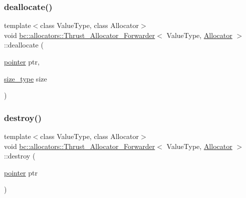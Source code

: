 \mbox{\label{structbc_1_1allocators_1_1Thrust__Allocator__Forwarder_a9102877ab68637a741aaf421b62bb2ef}} 
\subsubsection{\texorpdfstring{deallocate()}{deallocate()}}
{\footnotesize\ttfamily template$<$class Value\+Type, class Allocator$>$ \\
void \hyperlink{structbc_1_1allocators_1_1Thrust__Allocator__Forwarder}{bc\+::allocators\+::\+Thrust\+\_\+\+Allocator\+\_\+\+Forwarder}$<$ Value\+Type, \hyperlink{classbc_1_1allocators_1_1Allocator}{Allocator} $>$\+::deallocate (\begin{DoxyParamCaption}\item[{\hyperlink{structbc_1_1allocators_1_1Thrust__Allocator__Forwarder_ad65c1d99f764c14eb0f65dc78d36e56a}{pointer}}]{ptr,  }\item[{\hyperlink{structbc_1_1allocators_1_1Thrust__Allocator__Forwarder_a0d59ede93a4c3e6530494375e1e6821e}{size\+\_\+type}}]{size }\end{DoxyParamCaption})\hspace{0.3cm}{\ttfamily [inline]}}

\mbox{\label{structbc_1_1allocators_1_1Thrust__Allocator__Forwarder_a8f9d0dd547130ba530ba576af9eab1f7}} 
\subsubsection{\texorpdfstring{destroy()}{destroy()}}
{\footnotesize\ttfamily template$<$class Value\+Type, class Allocator$>$ \\
void \hyperlink{structbc_1_1allocators_1_1Thrust__Allocator__Forwarder}{bc\+::allocators\+::\+Thrust\+\_\+\+Allocator\+\_\+\+Forwarder}$<$ Value\+Type, \hyperlink{classbc_1_1allocators_1_1Allocator}{Allocator} $>$\+::destroy (\begin{DoxyParamCaption}\item[{\hyperlink{structbc_1_1allocators_1_1Thrust__Allocator__Forwarder_ad65c1d99f764c14eb0f65dc78d36e56a}{pointer}}]{ptr }\end{DoxyParamCaption})\hspace{0.3cm}{\ttfamily [inline]}}

